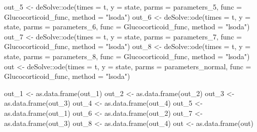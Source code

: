 \documentclass[
]{article}
\newenvironment{Shaded}{\begin{snugshade}}{\end{snugshade}}
\newcommand{\AttributeTok}[1]{\textcolor[rgb]{0.77,0.63,0.00}{#1}}
\newcommand{\FunctionTok}[1]{\textcolor[rgb]{0.00,0.00,0.00}{#1}}
\newcommand{\NormalTok}[1]{#1}
\newcommand{\OtherTok}[1]{\textcolor[rgb]{0.56,0.35,0.01}{#1}}
\newcommand{\SpecialCharTok}[1]{\textcolor[rgb]{0.00,0.00,0.00}{#1}}
\newcommand{\StringTok}[1]{\textcolor[rgb]{0.31,0.60,0.02}{#1}}
\begin{document}
\begin{Shaded}
\begin{Highlighting}[]
\NormalTok{out\_5 }\OtherTok{\textless{}{-}}\NormalTok{ deSolve}\SpecialCharTok{::}\FunctionTok{ode}\NormalTok{(}\AttributeTok{times =}\NormalTok{ t, }\AttributeTok{y =}\NormalTok{ state, }\AttributeTok{parms =}\NormalTok{ parameters\_5,}
                    \AttributeTok{func =}\NormalTok{ Glucocorticoid\_func, }\AttributeTok{method =} \StringTok{"lsoda"}\NormalTok{)}
\NormalTok{out\_6 }\OtherTok{\textless{}{-}}\NormalTok{ deSolve}\SpecialCharTok{::}\FunctionTok{ode}\NormalTok{(}\AttributeTok{times =}\NormalTok{ t, }\AttributeTok{y =}\NormalTok{ state, }\AttributeTok{parms =}\NormalTok{ parameters\_6,}
                    \AttributeTok{func =}\NormalTok{ Glucocorticoid\_func, }\AttributeTok{method =} \StringTok{"lsoda"}\NormalTok{)}
\NormalTok{out\_7 }\OtherTok{\textless{}{-}}\NormalTok{ deSolve}\SpecialCharTok{::}\FunctionTok{ode}\NormalTok{(}\AttributeTok{times =}\NormalTok{ t, }\AttributeTok{y =}\NormalTok{ state, }\AttributeTok{parms =}\NormalTok{ parameters\_7,}
                    \AttributeTok{func =}\NormalTok{ Glucocorticoid\_func, }\AttributeTok{method =} \StringTok{"lsoda"}\NormalTok{)}
\NormalTok{out\_8 }\OtherTok{\textless{}{-}}\NormalTok{ deSolve}\SpecialCharTok{::}\FunctionTok{ode}\NormalTok{(}\AttributeTok{times =}\NormalTok{ t, }\AttributeTok{y =}\NormalTok{ state, }\AttributeTok{parms =}\NormalTok{ parameters\_8,}
                    \AttributeTok{func =}\NormalTok{ Glucocorticoid\_func, }\AttributeTok{method =} \StringTok{"lsoda"}\NormalTok{)}
\NormalTok{out }\OtherTok{\textless{}{-}}\NormalTok{ deSolve}\SpecialCharTok{::}\FunctionTok{ode}\NormalTok{(}\AttributeTok{times =}\NormalTok{ t, }\AttributeTok{y =}\NormalTok{ state, }\AttributeTok{parms =}\NormalTok{ parameters\_normal,}
                    \AttributeTok{func =}\NormalTok{ Glucocorticoid\_func, }\AttributeTok{method =} \StringTok{"lsoda"}\NormalTok{)}

\NormalTok{out\_1 }\OtherTok{\textless{}{-}} \FunctionTok{as.data.frame}\NormalTok{(out\_1)}
\NormalTok{out\_2 }\OtherTok{\textless{}{-}} \FunctionTok{as.data.frame}\NormalTok{(out\_2)}
\NormalTok{out\_3 }\OtherTok{\textless{}{-}} \FunctionTok{as.data.frame}\NormalTok{(out\_3)}
\NormalTok{out\_4 }\OtherTok{\textless{}{-}} \FunctionTok{as.data.frame}\NormalTok{(out\_4)}
\NormalTok{out\_5 }\OtherTok{\textless{}{-}} \FunctionTok{as.data.frame}\NormalTok{(out\_1)}
\NormalTok{out\_6 }\OtherTok{\textless{}{-}} \FunctionTok{as.data.frame}\NormalTok{(out\_2)}
\NormalTok{out\_7 }\OtherTok{\textless{}{-}} \FunctionTok{as.data.frame}\NormalTok{(out\_3)}
\NormalTok{out\_8 }\OtherTok{\textless{}{-}} \FunctionTok{as.data.frame}\NormalTok{(out\_4)}
\NormalTok{out }\OtherTok{\textless{}{-}} \FunctionTok{as.data.frame}\NormalTok{(out)}


\end{Highlighting}
\end{Shaded}
\end{document}

